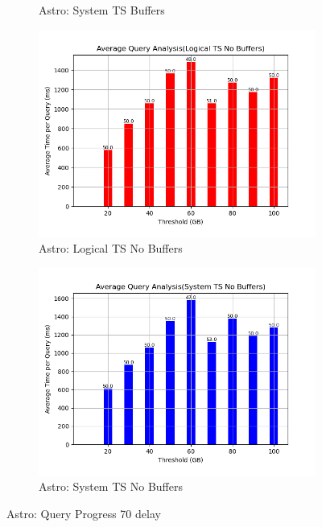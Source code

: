 \begin{figure}
\begin{subfigure}[c]{0.45\textwidth}
		\caption{Astro: System TS Buffers}
		\label{fig:system-ts-70-astro}
	\end{subfigure}
	\begin{subfigure}[c]{0.45\textwidth}
		\includegraphics[width=1\textwidth]	 {figures/Experiments/Dynamic/ASTRO/Batch_processing/70/average_query_time_per_batch_version_999777016_10485760_10_delay[70].png}
		\caption{Astro: Logical TS No Buffers}
		\label{fig:logical-ts-no-70-astro}
	\end{subfigure}
	\begin{subfigure}[c]{0.45\textwidth}
		\includegraphics[width=1\textwidth]	 {figures/Experiments/Dynamic/ASTRO/Batch_processing/70/average_query_time_per_batch_version_999777017_10485760_10_delay[70].png}
		\caption{Astro: System TS No Buffers}
		\label{fig:system-ts-no-70-astro}
	\end{subfigure}
	\caption{Astro: Query Progress 70 delay}
	\label{fig:query-progress-70-astro}
\end{figure}

